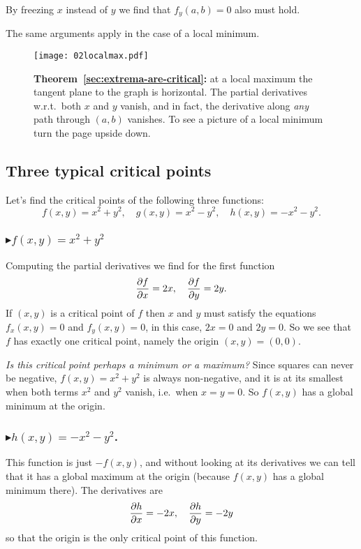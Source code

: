 By freezing $x$ instead of $y$ we find that $f_y(a,b)=0$ also must hold.

The same arguments apply in the case of a local minimum.
\begin{figure}[htb]
  \centering

  \texttt{[image: 02localmax.pdf]}
  \caption{\textbf{Theorem~\ref{sec:extrema-are-critical}: } at a local maximum
    the tangent plane to the graph is horizontal.  The partial derivatives
    w.r.t.\ both $x$ and $y$ vanish, and in fact, the derivative along
    \emph{any} path through $(a,b)$ vanishes.  To see a picture of a local
    minimum turn the page upside down.}
  \label{fig:max-are-critical-picture-proof}
\end{figure}

\subsection{Three typical critical points}

\label{sec:criticalpoint-examples} 
Let's find the critical points of the following three functions:
\[
f(x, y) = x^2+y^2, \quad g(x, y) = x^2-y^2, \quad h(x, y) = -x^2-y^2.
\]
\subsubsection*{$\blacktriangleright f(x, y) = x^2+y^2$}
Computing the partial derivatives we find for the first function
\[
\frac{\partial f}{\partial x} = 2x, \quad \frac{\partial f}{\partial y} = 2y.
\]
If $(x,y)$ is a critical point of $f$ then $x$ and $y$ must satisfy the
equations $f_x(x, y) = 0$ and $f_y(x, y) = 0$, in this case, $2x=0$ and $2y=0$.
So we see that $f$ has exactly one critical point, namely the origin $(x,y) =
(0,0)$.

\textit{Is this critical point perhaps a minimum or a maximum?}  Since squares
can never be negative, $f(x,y) = x^2+y^2$ is always non-negative, and it is at
its smallest when both terms $x^2$ and $y^2$ vanish, i.e.~when $x=y=0$.  So
$f(x, y)$ has a global minimum at the origin.

\subsubsection*{$\blacktriangleright h(x, y) = -x^2-y^2$. } 
This function is just $-f(x,y)$, and without looking at its derivatives we can
tell that it has a global maximum at the origin (because $f(x,y)$ has a global
minimum there).  The derivatives are
\[
\frac{\partial h}{\partial x} = -2x, \quad \frac{\partial h}{\partial y} = -2y
\]
so that the origin is the only critical point of this function.

